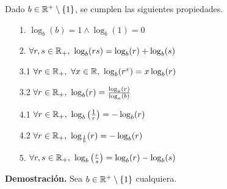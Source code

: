 \begin{prop}
Dado $b \in \mathbb{R}^+\setminus\{1\}$, se cumplen las siguientes propiedades.
\begin{enumerate}
\item[1.] $\log_b(b)=1\wedge \log_b(1)=0$
\item[2.] $\forall r,s\in\mathbb{R}_+,\  \log_b(rs)=\log_b(r)+\log_b(s)$
\item[3.1] $\forall r\in\mathbb{R}_+,\ \forall x\in\mathbb{R},\  \log_b(r^x)=x\log_b(r)$
\item[3.2] $\forall r\in\mathbb{R}_+,\  \log_b(r)=\frac{\log_a(r)}{\log_a(b)}$
\item[4.1] $\forall r\in\mathbb{R}_+,\  \log_b\left(\frac{1}{r}\right)=-\log_b(r)$
\item[4.2] $\forall r\in\mathbb{R}_+,\  \log_{\frac{1}{b}}(r)=-\log_b(r)$
\item[5.] $\forall r,s\in\mathbb{R}_+,\  \log_b\left(\frac{r}{s}\right)=\log_b(r)-\log_b(s)$
\end{enumerate}
\end{prop}
{\bf Demostración.} Sea $b \in \mathbb{R}^+\setminus\{1\}$ cualquiera.
